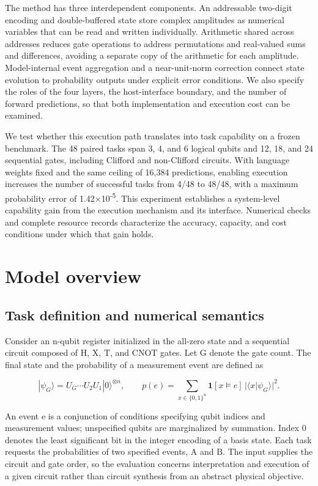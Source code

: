 \documentclass[11pt,a4paper]{article}
\begin{document}
The method has three interdependent components. An addressable two-digit encoding and double-buffered state store complex amplitudes as numerical variables that can be read and written individually. Arithmetic shared across addresses reduces gate operations to address permutations and real-valued sums and differences, avoiding a separate copy of the arithmetic for each amplitude. Model-internal event aggregation and a near-unit-norm correction connect state evolution to probability outputs under explicit error conditions. We also specify the roles of the four layers, the host-interface boundary, and the number of forward predictions, so that both implementation and execution cost can be examined.

We test whether this execution path translates into task capability on a frozen benchmark. The 48 paired tasks span 3, 4, and 6 logical qubits and 12, 18, and 24 sequential gates, including Clifford and non-Clifford circuits. With language weights fixed and the same ceiling of 16,384 predictions, enabling execution increases the number of successful tasks from 4/48 to 48/48, with a maximum probability error of 1.42\ensuremath{\times}10\textsuperscript{-5}. This experiment establishes a system-level capability gain from the execution mechanism and its interface. Numerical checks and complete resource records characterize the accuracy, capacity, and cost conditions under which that gain holds.

\section{Model overview}

\subsection{Task definition and numerical semantics}

Consider an n-qubit register initialized in the all-zero state and a sequential circuit composed of H, X, T, and CNOT gates. Let G denote the gate count. The final state and the probability of a measurement event are defined as

\begin{equation}
|\psi_G\rangle=U_G\cdots U_2U_1|0\rangle^{\otimes n},\qquad
p(e)=\sum_{x\in\{0,1\}^n}\mathbf{1}[x\models e]\,|\langle x|\psi_G\rangle|^2.
\end{equation}

An event e is a conjunction of conditions specifying qubit indices and measurement values; unspecified qubits are marginalized by summation. Index 0 denotes the least significant bit in the integer encoding of a basis state. Each task requests the probabilities of two specified events, A and B. The input supplies the circuit and gate order, so the evaluation concerns interpretation and execution of a given circuit rather than circuit synthesis from an abstract physical objective.
\end{document}
